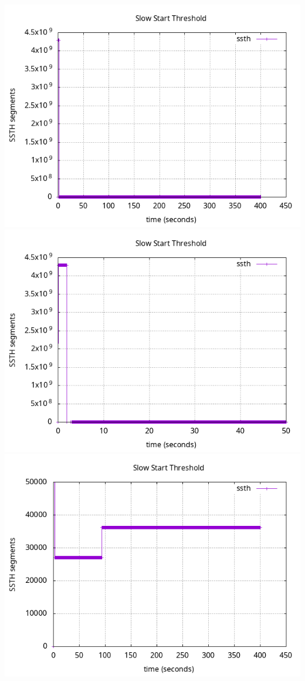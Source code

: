 \documentclass{article}
\begin{document}
\includegraphics[scale=0.5]{plots/lab1-group5-task1-question1.1.png}
\includegraphics[scale=0.5]{plots/lab1-group5-task1-question1.1-xrange-0-50.png}
\includegraphics[scale=0.5]{plots/lab1-group5-task1-question1.1-yrange-0-50000.png}
\end{document}

